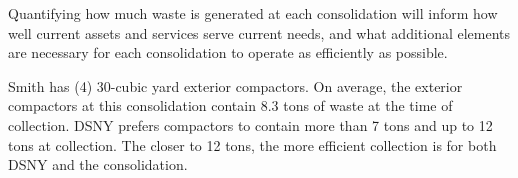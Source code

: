 
    Quantifying how much waste is generated at each consolidation will inform how well current assets and services serve current needs, and what additional elements are necessary for each consolidation to operate as efficiently as possible.
    
    Smith has (4) 30-cubic yard exterior compactors. On average, the exterior compactors at this consolidation contain 8.3 tons of waste at the time of collection. DSNY prefers compactors to contain more than 7 tons and up to 12 tons at collection. The closer to 12 tons, the more efficient collection is for both DSNY and the consolidation.
